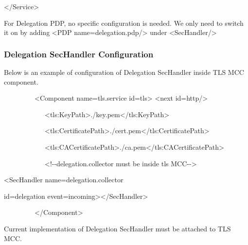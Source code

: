 \documentclass{article}
\begin{document}
{\ttfamily\color{black}
{\textless}/Service{\textgreater}}

{\upshape\color{black}
For Delegation PDP, no specific configuration is needed. We only need to
switch it on by adding {\textless}PDP
name={\textquotedbl}delegation.pdp{\textquotedbl}/{\textgreater} under
{\textless}SecHandler/{\textgreater}}

\subsubsection[Delegation SecHandler Configuration]{Delegation
SecHandler Configuration}
{\upshape\color{black}
Below is an example of configuration of Delegation SecHandler inside TLS
MCC component.}

{\ttfamily\color{black}
\ \ \ \ \ \ \ \ \ {\textless}Component
name={\textquotedbl}tls.service{\textquotedbl}
id={\textquotedbl}tls{\textquotedbl}{\textgreater} {\textless}next
id={\textquotedbl}http{\textquotedbl}/{\textgreater}}

{\ttfamily\color{black}
\ \ \ \ \ \ \ \ \ \ \ \ {\textless}tls:KeyPath{\textgreater}./key.pem{\textless}/tls:KeyPath{\textgreater}}

{\ttfamily\color{black}
\ \ \ \ \ \ \ \ \ \ \ \ {\textless}tls:CertificatePath{\textgreater}./cert.pem{\textless}/tls:CertificatePath{\textgreater}}

{\ttfamily\color{black}
\ \ \ \ \ \ \ \ \ \ \ \ {\textless}tls:CACertificatePath{\textgreater}./ca.pem{\textless}/tls:CACertificatePath{\textgreater}}

{\ttfamily\color{black}
\ \ \ \ \ \ \ \ \ \ \ \ {\textless}!-{}-delegation.collector must be
inside tls MCC-{}-{\textgreater}}

{\ttfamily\color{black}
{\textless}SecHandler
name={\textquotedbl}delegation.collector{\textquotedbl} }

{\ttfamily\color{black}
id={\textquotedbl}delegation{\textquotedbl}
event={\textquotedbl}incoming{\textquotedbl}{\textgreater}{\textless}/SecHandler{\textgreater}}

{\ttfamily\color{black}
\ \ \ \ \ \ \ \ \ {\textless}/Component{\textgreater}}

{\upshape\color{black}
Current implementation of Delegation\textbf{ }SecHandler must be
attached to TLS MCC. }
\end{document}
